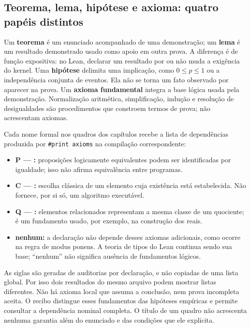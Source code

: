 \subsection{Teorema, lema, hipótese e axioma: quatro papéis distintos}
\label{sec:fundamentos-lean}
\begin{definicao}
Um \textbf{teorema} é um enunciado acompanhado de uma demonstração; um
\textbf{lema} é um resultado demonstrado usado como apoio em outra prova.
A diferença é de função expositiva: no Lean, declarar um resultado por
 ou  não muda a exigência do kernel. Uma
\textbf{hipótese} delimita uma implicação, como $0\leq p\leq1$ ou a independência
conjunta de eventos. Ela não se torna um fato observado por aparecer na prova.
Um \textbf{axioma fundamental} integra a base lógica usada pela demonstração.
Normalização aritmética, simplificação, indução e resolução de desigualdades
são procedimentos que constroem termos de prova; não acrescentam axiomas.
\end{definicao}

Cada nome formal nos quadros dos capítulos recebe a lista de dependências
produzida por \texttt{\#print axioms} na compilação correspondente:
\begin{itemize}[leftmargin=1.3em,itemsep=3pt]
\item \textbf{P — :} proposições logicamente equivalentes podem ser
identificadas por igualdade; isso não afirma equivalência entre programas.
\item \textbf{C — :} escolha clássica de um elemento cuja
existência está estabelecida. Não fornece, por si só, um algoritmo executável.
\item \textbf{Q — :} elementos relacionados representam a mesma
classe de um quociente; é um fundamento usado, por exemplo, na construção dos reais.
\item \textbf{nenhum:} a declaração não depende desses axiomas adicionais,
como ocorre na regra de modus ponens. A teoria de tipos do Lean continua sendo
sua base; ``nenhum'' não significa ausência de fundamentos lógicos.
\end{itemize}

As siglas são geradas de auditorias por declaração, e não copiadas de uma
lista global. Por isso dois resultados do mesmo arquivo podem mostrar listas
diferentes. Não há axioma local que assuma a conclusão, nem prova incompleta
aceita. O recibo distingue esses fundamentos das hipóteses empíricas e permite
consultar a dependência nominal completa. O título de um quadro não acrescenta
nenhuma garantia além do enunciado e das condições que ele explicita.


